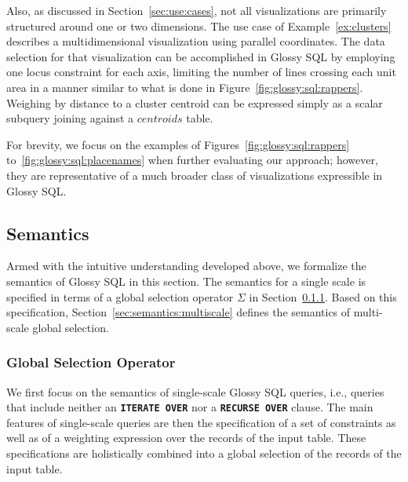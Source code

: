 \documentclass[11pt, oneside]{report}
\begin{document}
{Also, as discussed in Section~\ref{sec:use:cases}, not all visualizations are primarily structured around one or two dimensions. The use case of Example~\ref{ex:clusters} describes a multidimensional visualization using parallel coordinates. The data selection for that visualization can be accomplished in Glossy SQL by employing one locus constraint for each axis, limiting the number of lines crossing each unit area in a manner similar to what is done in Figure~\ref{fig:glossy:sql:rappers}. Weighing by distance to a cluster centroid can be expressed simply as a scalar subquery joining against a $centroids$ table. 

For brevity, we focus on the examples of Figures~\ref{fig:glossy:sql:rappers} to~\ref{fig:glossy:sql:placenames} when further evaluating our approach; however, they are representative of a much broader class of visualizations expressible in Glossy SQL.    

\subsection{Semantics}
\label{sec:semantics}


Armed with the intuitive understanding developed above, we formalize the semantics of Glossy SQL in this section. The semantics for a single scale is specified in terms of a global selection operator $\Sigma$ in Section~\ref{sec:semantics:global:selection}. Based on this specification, Section~\ref{sec:semantics:multiscale} defines the semantics of multi-scale global selection.

\subsubsection{Global Selection Operator}
\label{sec:semantics:global:selection}

We first focus on the semantics of single-scale Glossy SQL queries, i.e., queries that include neither an \textbf{\texttt{ITERATE OVER}} nor a \textbf{\texttt{RECURSE OVER}} clause. The main features of single-scale queries are then the specification of a set of constraints as well as of a weighting expression over the records of the input table. These specifications are holistically combined into a global selection of the records of the input table.

}
\end{document}
